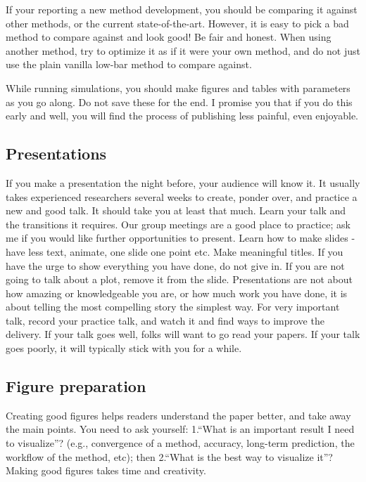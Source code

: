 \documentclass[12pt]{article}
\begin{document}
If your reporting a new method development, you should be comparing it against other methods, or the current state-of-the-art.
However, it is easy to pick a bad method to compare against and look good!
Be fair and honest.
When using another method, try to optimize it as if it were your own method, and do not just use the plain vanilla low-bar method to compare against.

While running simulations, you should make figures and tables with parameters as you go along.
Do not save these for the end.
I promise you that if you do this early and well, you will find the process of publishing less painful, even enjoyable.

\subsection{Presentations}
If you make a presentation the night before, your audience will know it.
It usually takes experienced researchers several weeks to create, ponder over, and practice a new and good talk.
It should take you at least that much.
Learn your talk and the transitions it requires.
Our group meetings are a good place to practice; ask me if you would like further opportunities to present.
Learn how to make slides - have less text, animate, one slide one point etc. Make meaningful titles.
If you have the urge to show everything you have done, do not give in.
If you are not going to talk about a plot, remove it from the slide.
Presentations are not about how amazing or knowledgeable you are, or how much work you have done, it is about telling the most compelling story the simplest way.
For very important talk, record your practice talk, and watch it and find ways to improve the delivery.
If your talk goes well, folks will want to go read your papers.
If your talk goes poorly, it will typically stick with you for a while.

\subsection{Figure preparation}
Creating good figures helps readers understand the paper better, and take away the main points.
You need to ask yourself: 1.\@ ``What is an important result I need to visualize''?
(e.g., convergence of a method, accuracy, long-term prediction, the workflow of the method, etc); then 2.\@ ``What is the best way to visualize it''?
Making good figures takes time and creativity.
\end{document}
